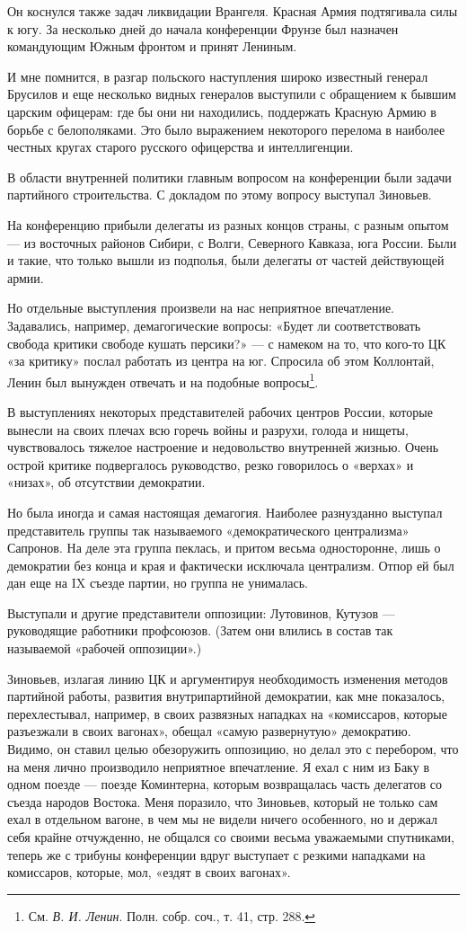 \documentclass[12pt, a4paper, openany]{book}
\begin{document}
Он коснулся также задач ликвидации Врангеля. Красная Армия подтягивала силы к югу. За несколько дней до начала конференции Фрунзе был назначен командующим Южным фронтом и принят Лениным.

И мне помнится, в разгар польского наступления широко известный генерал Брусилов и еще несколько видных генералов выступили с обращением к бывшим царским офицерам: где бы они ни находились, поддержать Красную Армию в борьбе с белополяками. Это было выражением некоторого перелома в наиболее честных кругах старого русского офицерства и интеллигенции.

В области внутренней политики главным вопросом на конференции были задачи партийного строительства. С докладом по этому вопросу выступал Зиновьев.

На конференцию прибыли делегаты из разных концов страны, с разным опытом — из восточных районов Сибири, с Волги, Северного Кавказа, юга России. Были и такие, что только вышли из подполья, были делегаты от частей действующей армии.

Но отдельные выступления произвели на нас неприятное впечатление. Задавались, например, демагогические вопросы: «Будет ли соответствовать свобода критики свободе кушать персики?» — с намеком на то, что кого-то ЦК «за критику» послал работать из центра на юг. Спросила об этом Коллонтай, Ленин был вынужден отвечать и на подобные вопросы\footnote{См. \textit{В. И. Ленин}. Полн. собр. соч., т. 41, стр. 288.}.

В выступлениях некоторых представителей рабочих центров России, которые вынесли на своих плечах всю горечь войны и разрухи, голода и нищеты, чувствовалось тяжелое настроение и недовольство внутренней жизнью. Очень острой критике подвергалось руководство, резко говорилось о «верхах» и «низах», об отсутствии демократии.

Но была иногда и самая настоящая демагогия. Наиболее разнузданно выступал представитель группы так называемого «демократического централизма» Сапронов. На деле эта группа пеклась, и притом весьма односторонне, лишь о демократии без конца и края и фактически исключала централизм. Отпор ей был дан еще на IX съезде партии, но группа не унималась.

Выступали и другие представители оппозиции: Лутовинов, Кутузов — руководящие работники профсоюзов. (Затем они влились в состав так называемой «рабочей оппозиции».)

Зиновьев, излагая линию ЦК и аргументируя необходимость изменения методов партийной работы, развития внутрипартийной демократии, как мне показалось, перехлестывал, например, в своих развязных нападках на «комиссаров, которые разъезжали в своих вагонах», обещал «самую развернутую» демократию. Видимо, он ставил целью обезоружить оппозицию, но делал это с перебором, что на меня лично производило неприятное впечатление. Я ехал с ним из Баку в одном поезде — поезде Коминтерна, которым возвращалась часть делегатов со съезда народов Востока. Меня поразило, что Зиновьев, который не только сам ехал в отдельном вагоне, в чем мы не видели ничего особенного, но и держал себя крайне отчужденно, не общался со своими весьма уважаемыми спутниками, теперь же с трибуны конференции вдруг выступает с резкими нападками на комиссаров, которые, мол, «ездят в своих вагонах».
\end{document}

